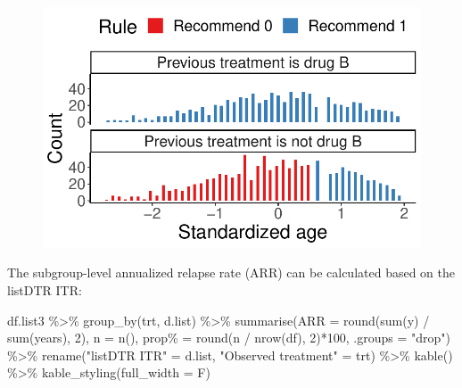 \documentclass[
  letterpaper,
  DIV=11,
  numbers=noendperiod]{scrreprt}
\newenvironment{Shaded}{\begin{snugshade}}{\end{snugshade}}
\newcommand{\AttributeTok}[1]{\textcolor[rgb]{0.40,0.45,0.13}{#1}}
\newcommand{\DecValTok}[1]{\textcolor[rgb]{0.68,0.00,0.00}{#1}}
\newcommand{\FunctionTok}[1]{\textcolor[rgb]{0.28,0.35,0.67}{#1}}
\newcommand{\NormalTok}[1]{\textcolor[rgb]{0.00,0.23,0.31}{#1}}
\newcommand{\OtherTok}[1]{\textcolor[rgb]{0.00,0.23,0.31}{#1}}
\newcommand{\SpecialCharTok}[1]{\textcolor[rgb]{0.37,0.37,0.37}{#1}}
\newcommand{\StringTok}[1]{\textcolor[rgb]{0.13,0.47,0.30}{#1}}
\begin{document}
\begin{figure}[H]

{\centering \includegraphics{chapter_18_files/figure-pdf/itr.list.scatter-1.pdf}

}

\end{figure}

The subgroup-level annualized relapse rate (ARR) can be calculated based
on the listDTR ITR:

\begin{Shaded}
\begin{Highlighting}[]
\NormalTok{df.list3 }\SpecialCharTok{\%\textgreater{}\%}
  \FunctionTok{group\_by}\NormalTok{(trt, d.list) }\SpecialCharTok{\%\textgreater{}\%}
  \FunctionTok{summarise}\NormalTok{(}\AttributeTok{ARR =} \FunctionTok{round}\NormalTok{(}\FunctionTok{sum}\NormalTok{(y) }\SpecialCharTok{/} \FunctionTok{sum}\NormalTok{(years), }\DecValTok{2}\NormalTok{),}
            \AttributeTok{n =} \FunctionTok{n}\NormalTok{(),}
            \StringTok{\textasciigrave{}}\AttributeTok{prop\%}\StringTok{\textasciigrave{}} \OtherTok{=} \FunctionTok{round}\NormalTok{(n }\SpecialCharTok{/} \FunctionTok{nrow}\NormalTok{(df), }\DecValTok{2}\NormalTok{)}\SpecialCharTok{*}\DecValTok{100}\NormalTok{, }\AttributeTok{.groups =} \StringTok{"drop"}\NormalTok{) }\SpecialCharTok{\%\textgreater{}\%}
  \FunctionTok{rename}\NormalTok{(}\StringTok{"listDTR ITR"} \OtherTok{=}\NormalTok{ d.list,}
         \StringTok{"Observed treatment"} \OtherTok{=}\NormalTok{ trt) }\SpecialCharTok{\%\textgreater{}\%}
  \FunctionTok{kable}\NormalTok{() }\SpecialCharTok{\%\textgreater{}\%}
  \FunctionTok{kable\_styling}\NormalTok{(}\AttributeTok{full\_width =}\NormalTok{ F)}
\end{Highlighting}
\end{Shaded}
\end{document}

